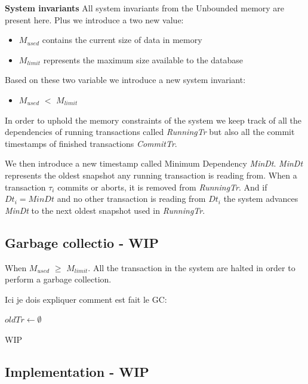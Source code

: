 \documentclass[systeme]{compas2022}
\begin{document}
\textbf{System invariants}
All system invariants from the Unbounded memory are present here.
Plus we introduce a two new value:
\begin{itemize}
  \item \emph{$M_{used}$} contains the current size of data in memory
  \item \emph{$M_{limit}$} represents the maximum size available to the database
\end{itemize}
Based on these two variable we introduce a new system invariant:
\begin{itemize}
  \item \emph{$M_{used}$} $<$ \emph{$M_{limit}$}
\end{itemize}
In order to uphold the memory constraints of the system we keep track of all the dependencies of running transactions called \emph{RunningTr} but also all the commit timestamps of finished transactions \emph{CommitTr}.

We then introduce a new timestamp called Minimum Dependency \emph{MinDt}.
\emph{MinDt} represents the oldest snapshot any running transaction is reading from.
When a transaction $\tau_i$ commits or aborts, it is removed from \emph{RunningTr}. 
And if $Dt_i = MinDt$ and no other transaction is reading from $Dt_i$ the system advances \emph{MinDt} to the next oldest snapshot used in \emph{RunningTr}.



\subsection{Garbage collectio - WIP}
When \emph{$M_{used}$} $\geq$ \emph{$M_{limit}$}. 
All the transaction in the system are halted in order to perform a garbage collection.

Ici je dois expliquer comment est fait le GC:\\
\begin{algorithm}
  \(oldTr \longleftarrow \emptyset\)\;
\end{algorithm}

WIP


\subsection{Implementation - WIP}
\end{document}
